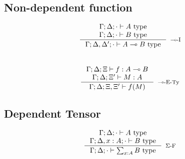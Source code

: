 \subsection{Non-dependent function}
\[
\begin{split}
\inference {\Gamma;  \Delta; \cdot \vdash A \text{ type}\\
\Gamma; \Delta; \cdot \vdash B \text{ type}
}
           {\Gamma; \Delta, \Delta'; \cdot \vdash A \multimap B \text{ type}
           }[$\multimap$-I]
\end{split}
\]
\\
\[
\begin{split}
\inference {\Gamma;  \Delta; \Xi \vdash f : A \multimap B\\
\Gamma;    \Delta; \Xi' \vdash M: A\\
}
           {\Gamma; \Delta; \Xi, \Xi' \vdash f (M)
           }[$\multimap$-E-Ty]
\end{split}
\]
\subsection{Dependent Tensor}
\[
\begin{split}
\inference {\Gamma; \Delta; \cdot \vdash A \text{ type}\\
 \Gamma; \Delta, x : A; \cdot \vdash B \text{ type}
  }
           {\Gamma; \Delta; \cdot \vdash \sum_{x: A}B \text{ type} 
             }[$\Sigma$-F]
\end{split}
\]\\


